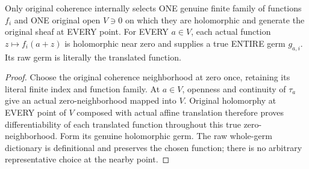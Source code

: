 \begin{theorem}
\label{hir:relative-normal-translated-jets-same-whole-functions}
\leanok
{}
Only original coherence internally selects ONE genuine finite family of
functions $f_i$ and ONE original open $V\ni0$ on which they are holomorphic
and generate the original sheaf at EVERY point. For EVERY $a\in V$, each
actual function $z\mapsto f_i(a+z)$ is holomorphic near zero and supplies a
true ENTIRE germ $g_{a,i}$. Its raw germ is literally the translated function.
\end{theorem}
\begin{proof}
Choose the original coherence neighborhood at zero once, retaining its
literal finite index and function family. At $a\in V$, openness and continuity
of $\tau_a$ give an actual zero-neighborhood mapped into $V$. Original
holomorphy at EVERY point of $V$ composed with actual affine translation
therefore proves differentiability of each translated function throughout
this true zero-neighborhood. Form its genuine holomorphic germ. The raw
whole-germ dictionary is definitional and preserves the chosen function;
there is no arbitrary representative choice at the nearby point.
\end{proof}

